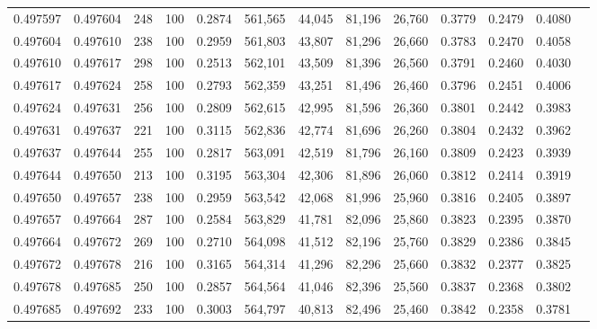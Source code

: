 \begin{tabular}{rrrrrrrrrrrrr}
0.497597 & 0.497604 &   248 & 100 &                                     0.2874 & 561,565 &  44,045 &  81,196 &  26,760 & 0.3779 & 0.2479 & 0.4080 \\
0.497604 & 0.497610 &   238 & 100 &                                     0.2959 & 561,803 &  43,807 &  81,296 &  26,660 & 0.3783 & 0.2470 & 0.4058 \\
0.497610 & 0.497617 &   298 & 100 &                                     0.2513 & 562,101 &  43,509 &  81,396 &  26,560 & 0.3791 & 0.2460 & 0.4030 \\
0.497617 & 0.497624 &   258 & 100 &                                     0.2793 & 562,359 &  43,251 &  81,496 &  26,460 & 0.3796 & 0.2451 & 0.4006 \\
0.497624 & 0.497631 &   256 & 100 &                                     0.2809 & 562,615 &  42,995 &  81,596 &  26,360 & 0.3801 & 0.2442 & 0.3983 \\
0.497631 & 0.497637 &   221 & 100 &                                     0.3115 & 562,836 &  42,774 &  81,696 &  26,260 & 0.3804 & 0.2432 & 0.3962 \\
0.497637 & 0.497644 &   255 & 100 &                                     0.2817 & 563,091 &  42,519 &  81,796 &  26,160 & 0.3809 & 0.2423 & 0.3939 \\
0.497644 & 0.497650 &   213 & 100 &                                     0.3195 & 563,304 &  42,306 &  81,896 &  26,060 & 0.3812 & 0.2414 & 0.3919 \\
0.497650 & 0.497657 &   238 & 100 &                                     0.2959 & 563,542 &  42,068 &  81,996 &  25,960 & 0.3816 & 0.2405 & 0.3897 \\
0.497657 & 0.497664 &   287 & 100 &                                     0.2584 & 563,829 &  41,781 &  82,096 &  25,860 & 0.3823 & 0.2395 & 0.3870 \\
0.497664 & 0.497672 &   269 & 100 &                                     0.2710 & 564,098 &  41,512 &  82,196 &  25,760 & 0.3829 & 0.2386 & 0.3845 \\
0.497672 & 0.497678 &   216 & 100 &                                     0.3165 & 564,314 &  41,296 &  82,296 &  25,660 & 0.3832 & 0.2377 & 0.3825 \\
0.497678 & 0.497685 &   250 & 100 &                                     0.2857 & 564,564 &  41,046 &  82,396 &  25,560 & 0.3837 & 0.2368 & 0.3802 \\
0.497685 & 0.497692 &   233 & 100 &                                     0.3003 & 564,797 &  40,813 &  82,496 &  25,460 & 0.3842 & 0.2358 & 0.3781 \\

\end{tabular}
